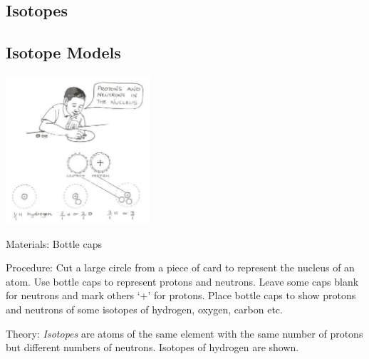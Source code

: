 \begin{multicols}{2}

\section*{Isotopes}


\subsection{Isotope Models}

\begin{center}
\includegraphics[width=0.4\textwidth]{./img/source/isotopes.jpg}
\end{center}

\begin{description*}
\item[Materials:]{Bottle caps}
\item[Procedure:]{Cut a large
circle from a piece of card to represent
the nucleus of an atom. Use bottle caps to represent protons and
neutrons. Leave some caps blank
for neutrons and mark others `+' for protons.
Place bottle caps to show protons and neutrons of some
isotopes of hydrogen, oxygen, carbon etc.}
\item[Theory:]{\emph{Isotopes} are atoms of the same element with the same number of protons but different numbers of neutrons. Isotopes of hydrogen are shown.}
\end{description*}



\end{multicols}

\pagebreak